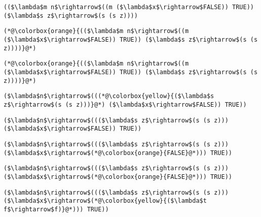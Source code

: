 \documentclass{beamer}
\begin{document}
\begin{frame}[fragile]{\CurrentSection}
\lstset{basicstyle=\ttfamily\small}\lstset{numbers=none}\lstset{language=ML}\begin{lstlisting}
(($\lambda$m n$\rightarrow$((m ($\lambda$x$\rightarrow$FALSE)) TRUE)) ($\lambda$s z$\rightarrow$(s (s z))))
\end{lstlisting}
\pause\lstset{language=ML}\begin{lstlisting}
(*@\colorbox{orange}{(($\lambda$m n$\rightarrow$((m ($\lambda$x$\rightarrow$FALSE)) TRUE)) ($\lambda$s z$\rightarrow$(s (s z))))}@*)
\end{lstlisting}

\end{frame}

\begin{frame}[fragile]{\CurrentSection}
\lstset{basicstyle=\ttfamily\small}\lstset{numbers=none}\lstset{language=ML}\begin{lstlisting}
(*@\colorbox{orange}{(($\lambda$m n$\rightarrow$((m ($\lambda$x$\rightarrow$FALSE)) TRUE)) ($\lambda$s z$\rightarrow$(s (s z))))}@*)
\end{lstlisting}
\pause\lstset{language=ML}\begin{lstlisting}
($\lambda$n$\rightarrow$(((*@\colorbox{yellow}{($\lambda$s z$\rightarrow$(s (s z)))}@*) ($\lambda$x$\rightarrow$FALSE)) TRUE))
\end{lstlisting}

\end{frame}

\begin{frame}[fragile]{\CurrentSection}
\lstset{basicstyle=\ttfamily\small}\lstset{numbers=none}\lstset{language=ML}\begin{lstlisting}
($\lambda$n$\rightarrow$((($\lambda$s z$\rightarrow$(s (s z))) ($\lambda$x$\rightarrow$FALSE)) TRUE))
\end{lstlisting}
\pause\lstset{language=ML}\begin{lstlisting}
($\lambda$n$\rightarrow$((($\lambda$s z$\rightarrow$(s (s z))) ($\lambda$x$\rightarrow$(*@\colorbox{orange}{FALSE}@*))) TRUE))
\end{lstlisting}

\end{frame}

\begin{frame}[fragile]{\CurrentSection}
\lstset{basicstyle=\ttfamily\small}\lstset{numbers=none}\lstset{language=ML}\begin{lstlisting}
($\lambda$n$\rightarrow$((($\lambda$s z$\rightarrow$(s (s z))) ($\lambda$x$\rightarrow$(*@\colorbox{orange}{FALSE}@*))) TRUE))
\end{lstlisting}
\pause\lstset{language=ML}\begin{lstlisting}
($\lambda$n$\rightarrow$((($\lambda$s z$\rightarrow$(s (s z))) ($\lambda$x$\rightarrow$(*@\colorbox{yellow}{($\lambda$t f$\rightarrow$f)}@*))) TRUE))
\end{lstlisting}

\end{frame}
\end{document}
